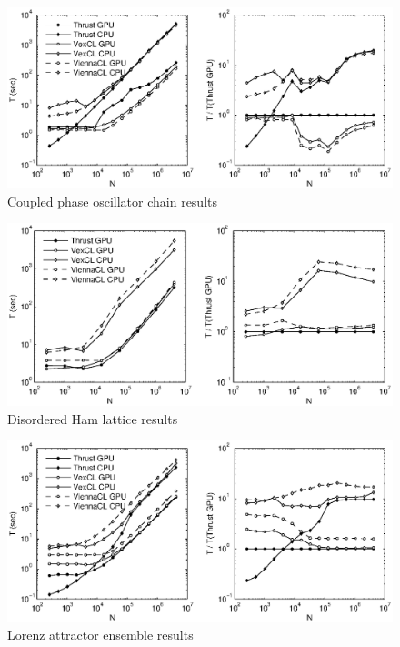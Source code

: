 \documentclass[1p]{elsarticle}
\begin{document}
\begin{figure}[p]
    \begin{center}
        \includegraphics[width=\textwidth]{data/phase_oscillator_chain/perfcmp}
    \end{center}
    \caption{Coupled phase oscillator chain results}
    \label{fig:phase:perf}
\end{figure}

\begin{figure}[p]
    \begin{center}
        \includegraphics[width=\textwidth]{data/disordered_ham_lattice/perfcmp}
    \end{center}
    \caption{Disordered Ham lattice results}
    \label{fig:lattice:perf}
\end{figure}

\begin{figure}[p]
    \begin{center}
        \includegraphics[width=\textwidth]{data/lorenz_ensemble/perfcmp}
    \end{center}
    \caption{Lorenz attractor ensemble results}
    \label{fig:lorenz:perf}
\end{figure}
\end{document}
